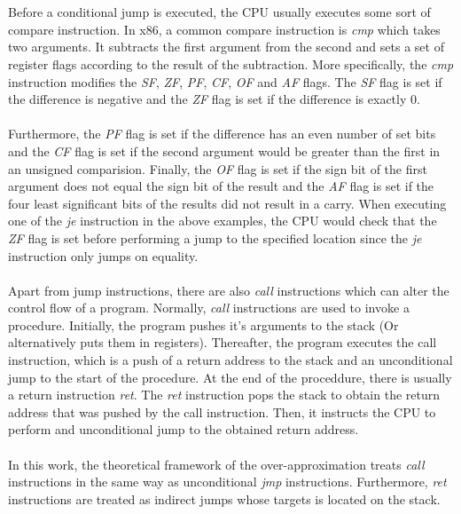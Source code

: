 \documentclass{kththesis}
\begin{document}
\\ \\
Before a conditional jump is executed, the CPU usually executes some sort of compare instruction. In x86, a common compare instruction is \textit{cmp} which takes two arguments. It subtracts the first argument from the second and sets a set of register flags according to the result of the subtraction. More specifically, the \textit{cmp} instruction modifies the \textit{SF}, \textit{ZF}, \textit{PF}, \textit{CF}, \textit{OF} and \textit{AF} flags. The \textit{SF} flag is set if the difference is negative and the \textit{ZF} flag is set if the difference is exactly 0.
\\ \\
Furthermore, the \textit{PF} flag is set if the difference has an even number of set bits and the \textit{CF} flag is set if the second argument would be greater than the first in an unsigned comparision. Finally, the \textit{OF} flag is set if the sign bit of the first argument does not equal the sign bit of the result and the \textit{AF} flag is set if the four least significant bits of the results did not result in a carry. When executing one of the \textit{je} instruction in the above examples, the CPU would check that the \textit{ZF} flag is set before performing a jump to the specified location since the \textit{je} instruction only jumps on equality.
\\ \\
Apart from jump instructions, there are also \textit{call} instructions which can alter the control flow of a program. Normally, \textit{call} instructions are used to invoke a procedure. Initially, the program pushes it's arguments to the stack (Or alternatively puts them in registers). Thereafter, the program executes the call instruction, which is a push of a return address to the stack and an unconditional jump to the start of the procedure. At the end of the proceddure, there is usually a return instruction \textit{ret}. The \textit{ret} instruction pops the stack to obtain the return address that was pushed by the call instruction. Then, it instructs the CPU to perform and unconditional jump to the obtained return address. 
\\ \\ 
In this work, the theoretical framework of the over-approximation treats \textit{call} instructions in the same way as unconditional \textit{jmp} instructions. Furthermore, \textit{ret} instructions are treated as indirect jumps whose targets is located on the stack.
\end{document}
